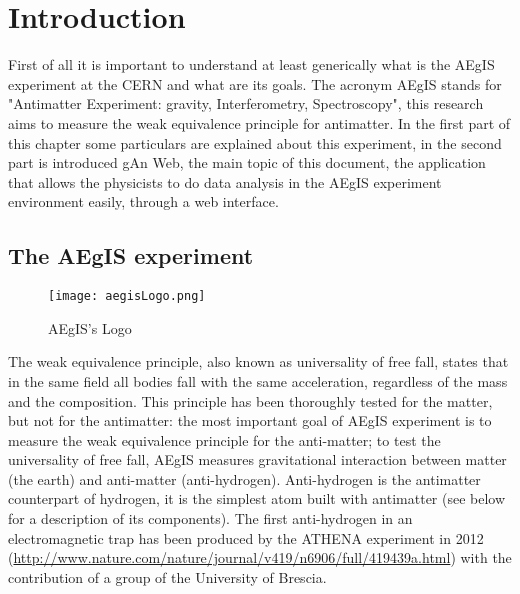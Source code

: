 
\chapter{Introduction} %

\label{Chapter1} %


First of all it is important to understand at least generically what is the AEgIS experiment at the CERN and what are its goals. The acronym AEgIS stands for "Antimatter Experiment: gravity, Interferometry, Spectroscopy", this research aims to measure the weak equivalence principle for antimatter. In the first part of this chapter some particulars are explained about this experiment, in the second part is introduced gAn Web, the main topic of this document, the application that allows the physicists to do data analysis in the AEgIS experiment environment easily, through a web interface. 

\section{The AEgIS experiment}


\begin{figure}[H]
\centering
\texttt{[image: aegisLogo.png]} 
\caption{AEgIS's Logo}
\end{figure}

The weak equivalence principle, also known as universality of free fall, states that in the same field all bodies fall with the same acceleration, regardless of the mass and the composition. This principle has been thoroughly tested for the matter, but not for the antimatter: the most important goal of AEgIS experiment is to measure the weak equivalence principle for the anti-matter; to test the universality of free fall, AEgIS measures gravitational interaction between matter (the earth) and anti-matter (anti-hydrogen). Anti-hydrogen is the antimatter counterpart of hydrogen, it is the simplest atom built with antimatter (see below for a description of its components). The first anti-hydrogen in an electromagnetic trap has been produced by the ATHENA experiment in 2012 (\url{http://www.nature.com/nature/journal/v419/n6906/full/419439a.html})
with the contribution of a group of the University of Brescia.

